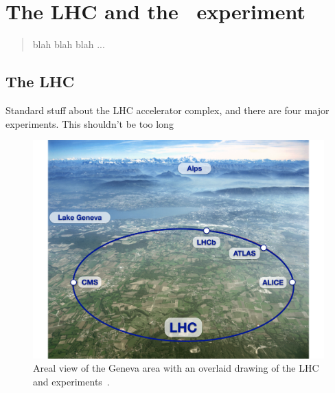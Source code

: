 \chapter[The LHC and the \atlas\ experiment][The LHC and \atlas]
        {The LHC and the \atlas\ experiment}
\label{ch:lhc}

\begin{quote}
  blah blah blah ...
\end{quote}

\FloatBarrier
\section{The LHC}
\label{sec:lhc}

{\color{red}Standard stuff about the LHC accelerator complex, and there
  are four major experiments. This shouldn't be too long}

\begin{figure}[ht]
  \centering
  \includegraphics[width=\textwidth, clip=true, trim=0 0 1cm 0]
    {figs/lhc/lhc_aerial.pdf}
  \caption{
    Areal view of the Geneva area with an overlaid drawing of the LHC
    and experiments~\cite{lhc_aerial}.
  }
  \label{fig:lhc_aerial}
\end{figure}

